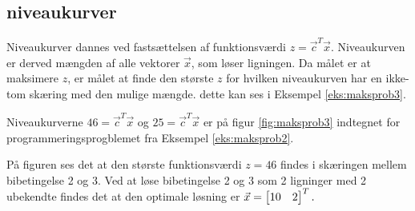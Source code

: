 \subsection{niveaukurver}
Niveaukurver dannes ved fastsættelsen af funktionsværdi $z=\vec{c}^T \vec{x}$. Niveaukurven er derved mængden af alle vektorer $\vec{x}$, som løser ligningen. Da målet er at maksimere $z$, er målet at finde den største $z$ for hvilken niveaukurven har en ikke-tom skæring med den mulige mængde. dette kan ses i Eksempel \ref{eks:maksprob3}.
\begin{comment}
Bør niveaukurve defineres????? Hvordan kan dette bruges for finde $z$ er egentlig bare en omskrivning, så der mangler noget argumentation for at $z$ bliver større jo længere væk fra origo man er, hvilket giver ret god mening, men er svært at argumentere for uden at starte på geometri, så måske hele dette afsnit skulle flyttes, måske skal alt om løsninger skal flyttes til geometri?
\end{comment}


\begin{eks}
Niveaukurverne $46=\vec{c}^T \vec{x}$ og $25=\vec{c}^T \vec{x}$ er på figur \ref{fig:maksprob3} indtegnet for programmeringsprogblemet fra Eksempel \ref{eks:maksprob2}.

	\begin{center}	
		
		\label{fig:maksprob3}
	\end{center}
	
På figuren ses det at den største funktionsværdi $z=46$ findes i skæringen mellem bibetingelse 2 og 3.
Ved at løse bibetingelse 2 og 3 som 2 ligninger med 2 ubekendte findes det at den optimale løsning er $\vec{x}=\begin{bmatrix} 10 & 2 \end{bmatrix}^T.$
\label{eks:maksprob3}
\end{eks}


\begin{comment}
Stadig to do i afsnittet\\
- Hvis der findes en løsning, findes der en optimal løsning (med evt. bevis. burde ikke være så svært med modstrid)\\

Skal jeg have det med at løsninger findes i hjørner? det virker til at kræve en smule mere geometri og hører nok bedre til i geometri afsnittet. %

\end{comment}
